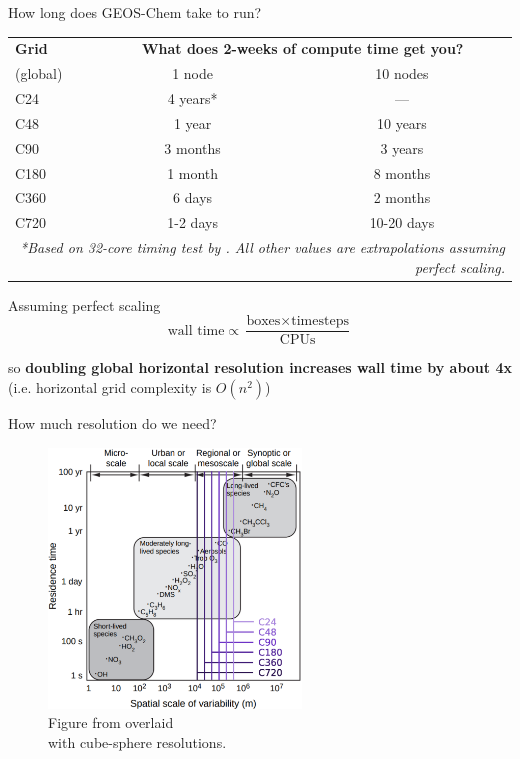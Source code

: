 \documentclass[10pt]{beamer}
\newcommand{\semitransp}[2][35]{\color{fg!#1}#2}
\begin{document}
\begin{frame}[fragile]{How long does GEOS-Chem take to run?}
    \small
    \begin{table}[]
    \begin{tabular}{lcc}
        \hline
        \textbf{Grid} & \multicolumn{2}{c}{\textbf{What does 2-weeks of compute time get you?}} \\ 
        (global) & 1 node & 10 nodes \\ 
        \hline
        C24 & 4 years* & --- \\ 
        C48 & 1 year &  10 years \\ 
        C90 & \semitransp[60]{3 months} & 3 years \\ 
        C180 & \semitransp[60]{1 month} & 8 months \\ 
        C360 & \semitransp[60]{6 days} & 2 months \\ 
        \semitransp[60]{C720} & \semitransp[60]{1-2 days} & \semitransp[60]{10-20 days} \\ \hline
        \multicolumn{3}{r}{\fontsize{4}{4}\selectfont\textit{*Based on 32-core timing test by \cite{yantosca_timing_2018}. All other values are extrapolations assuming perfect scaling.}} \\ 
    \end{tabular}
    \end{table}
    
    \pause
    
    Assuming perfect scaling
    $$\text{wall time} \propto \frac{\text{boxes} \times \text{timesteps}}{\text{CPUs}}$$
    
    so \textbf{doubling global horizontal resolution increases wall time by about 4x} (i.e. horizontal grid complexity is $O(n^2)$)    
\end{frame}

\begin{frame}[fragile]{How much resolution do we need?}
    \begin{figure}
        \centering
        \includegraphics[width=0.6\textwidth]{species-scale.eps}
        \captionsetup{labelformat=empty}
        \caption{Figure from \cite{wallace_atmospheric_2006} overlaid \\ with cube-sphere resolutions.}
    \end{figure}
\end{frame}
\end{document}
